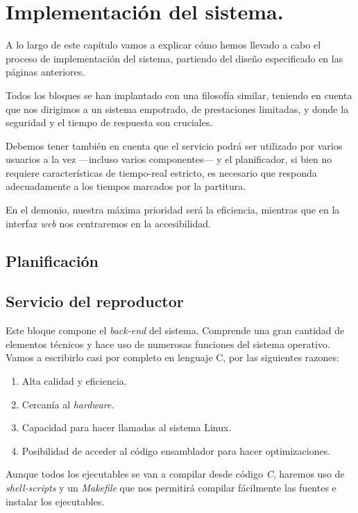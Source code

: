 \chapter{Implementación del sistema.}
\label{cap: capitulo_5}

A lo largo de este capítulo vamos a explicar cómo hemos llevado a cabo el proceso de implementación del sistema, partiendo del diseño especificado en las páginas anteriores.

Todos los bloques se han implantado con una filosofía similar, teniendo en cuenta que nos dirigimos a un sistema empotrado, de prestaciones limitadas, y donde la seguridad y el tiempo de respuesta son cruciales.

Debemos tener también en cuenta que el servicio podrá ser utilizado por varios usuarios a la vez ---incluso varios componentes--- y el planificador, si bien no requiere características de tiempo-real estricto, es necesario que responda adecuadamente a los tiempos marcados por la partitura.

En el demonio, nuestra máxima prioridad será la eficiencia, mientras que en la interfaz \textit{web} nos centraremos en la accesibilidad.

\section{Planificación}

\section{Servicio del reproductor}

Este bloque compone el \textit{back-end} del sistema. Comprende una gran cantidad de elementos técnicos y hace uso de numerosas funciones del sistema operativo. Vamos a escribirlo casi por completo en lenguaje C, por las siguientes razones:

\begin{enumerate}
	\item Alta calidad y eficiencia.
	\item Cercanía al \textit{hardware}.
	\item Capacidad para hacer llamadas al sistema Linux.
	\item Posibilidad de acceder al código ensamblador para hacer optimizaciones.
\end{enumerate}

Aunque todos los ejecutables se van a compilar desde código \textit{C}, haremos uso de \textit{shell-scripts} y un \textit{Makefile} que nos permitirá compilar fácilmente las fuentes e instalar los ejecutables.

